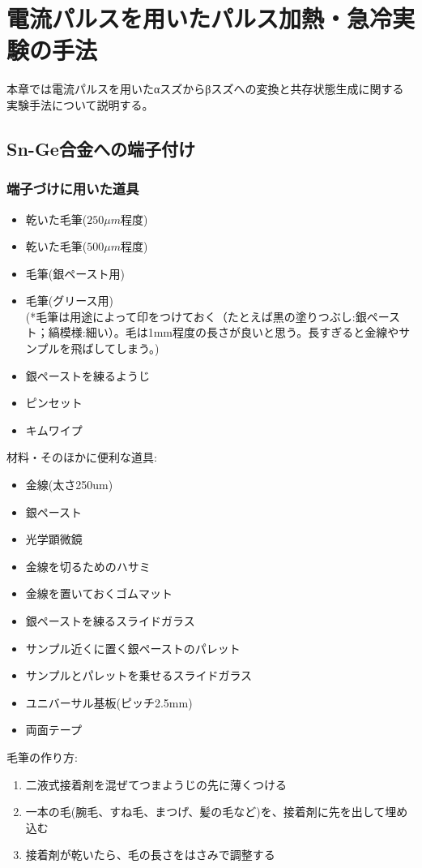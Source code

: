 \section{電流パルスを用いたパルス加熱・急冷実験の手法}
本章では電流パルスを用いたαスズからβスズへの変換と共存状態生成に関する実験手法について説明する。

\subsection{Sn-Ge合金への端子付け}

\subsubsection{端子づけに用いた道具}
\begin{itemize}
\item 乾いた毛筆($250\mu m$程度)
\item 乾いた毛筆($500\mu m$程度)
\item 毛筆(銀ペースト用)
\item 毛筆(グリース用)\\
(*毛筆は用途によって印をつけておく（たとえば黒の塗りつぶし:銀ペースト；縞模様:細い）。毛は1mm程度の長さが良いと思う。長すぎると金線やサンプルを飛ばしてしまう。)
\item 銀ペーストを練るようじ
\item ピンセット
\item キムワイプ
\end{itemize}

材料・そのほかに便利な道具:
\begin{itemize}
\item 金線(太さ250um)
\item 銀ペースト
\item 光学顕微鏡
\item 金線を切るためのハサミ
\item 金線を置いておくゴムマット
\item 銀ペーストを練るスライドガラス
\item サンプル近くに置く銀ペーストのパレット
\item サンプルとパレットを乗せるスライドガラス
\item ユニバーサル基板(ピッチ2.5mm)
\item 両面テープ
\end{itemize}

毛筆の作り方:
\begin{enumerate}
\item 二液式接着剤を混ぜてつまようじの先に薄くつける
\item 一本の毛(腕毛、すね毛、まつげ、髪の毛など)を、接着剤に先を出して埋め込む
\item  接着剤が乾いたら、毛の長さをはさみで調整する
 \end{enumerate}

